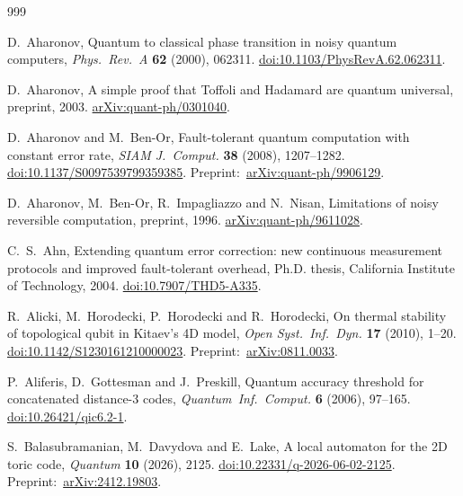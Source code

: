 \begin{thebibliography}{999}
{}
\raggedright\frenchspacing

D.~Aharonov,
Quantum to classical phase transition in noisy quantum computers,
\emph{Phys.~Rev.~A} \textbf{62} (2000), 062311.
\href{https://doi.org/10.1103/PhysRevA.62.062311}{doi:10.1103/PhysRevA.62.062311}.

D.~Aharonov,
A simple proof that Toffoli and Hadamard are quantum universal,
preprint, 2003.
\href{https://arxiv.org/abs/quant-ph/0301040}{arXiv:quant-ph/0301040}.

D.~Aharonov and M.~Ben-Or,
Fault-tolerant quantum computation with constant error rate,
\emph{SIAM J.~Comput.} \textbf{38} (2008), 1207--1282.
\href{https://doi.org/10.1137/S0097539799359385}{doi:10.1137/S0097539799359385}.
Preprint:~\href{https://arxiv.org/abs/quant-ph/9906129}{arXiv:quant-ph/9906129}.

D.~Aharonov, M.~Ben-Or, R.~Impagliazzo and N.~Nisan,
Limitations of noisy reversible computation,
preprint, 1996.
\href{https://arxiv.org/abs/quant-ph/9611028}{arXiv:quant-ph/9611028}.

C.~S.~Ahn,
Extending quantum error correction: new continuous measurement
protocols and improved fault-tolerant overhead,
Ph.D. thesis, California Institute of Technology, 2004.
\href{https://doi.org/10.7907/THD5-A335}{doi:10.7907/THD5-A335}.

R.~Alicki, M.~Horodecki, P.~Horodecki and R.~Horodecki,
On thermal stability of topological qubit in Kitaev's 4D model,
\emph{Open Syst.~Inf.~Dyn.} \textbf{17} (2010), 1--20.
\href{https://doi.org/10.1142/S1230161210000023}{doi:10.1142/S1230161210000023}.
Preprint:~\href{https://arxiv.org/abs/0811.0033}{arXiv:0811.0033}.

P.~Aliferis, D.~Gottesman and J.~Preskill,
Quantum accuracy threshold for concatenated distance-3 codes,
\emph{Quantum~Inf.~Comput.} \textbf{6} (2006), 97--165.
\href{https://doi.org/10.26421/qic6.2-1}{doi:10.26421/qic6.2-1}.

S.~Balasubramanian, M.~Davydova and E.~Lake,
A local automaton for the 2D toric code,
\emph{Quantum} \textbf{10} (2026), 2125.
\href{https://doi.org/10.22331/q-2026-06-02-2125}{doi:10.22331/q-2026-06-02-2125}.
Preprint:~\href{https://arxiv.org/abs/2412.19803}{arXiv:2412.19803}.


\end{thebibliography}
